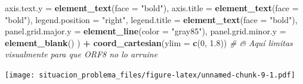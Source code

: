 \documentclass[
]{article}
\newenvironment{Shaded}{\begin{snugshade}}{\end{snugshade}}
\newcommand{\AttributeTok}[1]{\textcolor[rgb]{0.13,0.29,0.53}{#1}}
\newcommand{\CommentTok}[1]{\textcolor[rgb]{0.56,0.35,0.01}{\textit{#1}}}
\newcommand{\DecValTok}[1]{\textcolor[rgb]{0.00,0.00,0.81}{#1}}
\newcommand{\FloatTok}[1]{\textcolor[rgb]{0.00,0.00,0.81}{#1}}
\newcommand{\FunctionTok}[1]{\textcolor[rgb]{0.13,0.29,0.53}{\textbf{#1}}}
\newcommand{\NormalTok}[1]{#1}
\newcommand{\SpecialCharTok}[1]{\textcolor[rgb]{0.81,0.36,0.00}{\textbf{#1}}}
\newcommand{\StringTok}[1]{\textcolor[rgb]{0.31,0.60,0.02}{#1}}
\begin{document}
\begin{Shaded}
\begin{Highlighting}[]
    \AttributeTok{axis.text.y =} \FunctionTok{element\_text}\NormalTok{(}\AttributeTok{face =} \StringTok{"bold"}\NormalTok{),}
    \AttributeTok{axis.title =} \FunctionTok{element\_text}\NormalTok{(}\AttributeTok{face =} \StringTok{"bold"}\NormalTok{),}
    \AttributeTok{legend.position =} \StringTok{"right"}\NormalTok{,}
    \AttributeTok{legend.title =} \FunctionTok{element\_text}\NormalTok{(}\AttributeTok{face =} \StringTok{"bold"}\NormalTok{),}
    \AttributeTok{panel.grid.major.y =} \FunctionTok{element\_line}\NormalTok{(}\AttributeTok{color =} \StringTok{"gray85"}\NormalTok{),}
    \AttributeTok{panel.grid.minor.y =} \FunctionTok{element\_blank}\NormalTok{()}
\NormalTok{  ) }\SpecialCharTok{+}
  \FunctionTok{coord\_cartesian}\NormalTok{(}\AttributeTok{ylim =} \FunctionTok{c}\NormalTok{(}\DecValTok{0}\NormalTok{, }\FloatTok{1.8}\NormalTok{))  }\CommentTok{\# 🔥 Aquí limitas visualmente para que ORF8 no lo arruine}
\end{Highlighting}
\end{Shaded}

\texttt{[image: situacion\_problema\_files/figure-latex/unnamed-chunk-9-1.pdf]}
\end{document}
